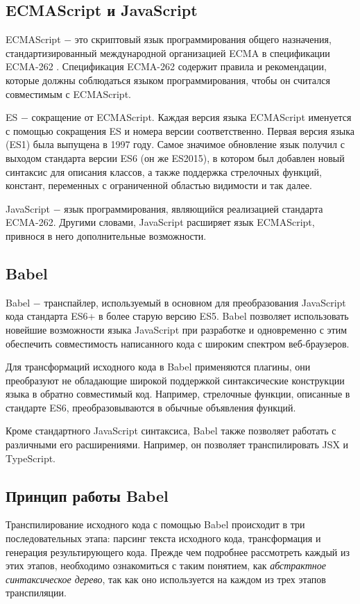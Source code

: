 \documentclass[14pt, a4paper]{article}
\begin{document}
\subsection{ECMAScript и JavaScript}
ECMAScript $-$ это скриптовый язык программирования общего назначения, стандартизированный международной
организацией ECMA в спецификации ECMA-262 \cite{ecma-262}. Спецификация ECMA-262 содержит правила и рекомендации,
которые должны соблюдаться языком программирования, чтобы он считался совместимым с ECMAScript.

ES $-$ сокращение от ECMAScript. Каждая версия языка ECMAScript именуется с помощью сокращения ES и
номера версии соответственно. Первая версия языка (ES1)  была выпущена в 1997 году. Самое значимое
обновление язык получил с выходом стандарта версии ES6 (он же ES2015), в котором был добавлен новый
синтаксис для описания классов, а также поддержка стрелочных функций, констант,  переменных с ограниченной областью
видимости и так далее.

JavaScript $-$ язык программирования, являющийся реализацией стандарта ECMA-262. Другими словами,
JavaScript расширяет язык ECMAScript, привнося в него дополнительные возможности.

\subsection{Babel}
Babel $-$  транспайлер, используемый в основном для преобразования JavaScript кода стандарта ES6+ в
более старую версию ES5. Babel позволяет использовать новейшие возможности языка  JavaScript при
разработке и одновременно с этим обеспечить совместимость написанного кода с широким спектром веб-браузеров.

Для трансформаций исходного кода в Babel применяются плагины, они преобразуют не обладающие широкой
поддержкой синтаксические конструкции языка в обратно совместимый код. Например, стрелочные функции,
описанные в стандарте ES6, преобразовываются в обычные объявления функций.

Кроме стандартного JavaScript синтаксиса, Babel также позволяет работать с различными его расширениями.
Например, он позволяет транспилировать JSX и TypeScript.

\subsection{Принцип работы Babel}

Транспилирование исходного кода с помощью Babel происходит в три последовательных этапа: парсинг текста
исходного кода, трансформация и генерация результирующего кода. Прежде чем подробнее рассмотреть каждый из
этих этапов, необходимо ознакомиться с таким понятием, как \textit{абстрактное синтаксическое дерево},
так как оно используется на каждом из трех этапов транспиляции.
\end{document}
